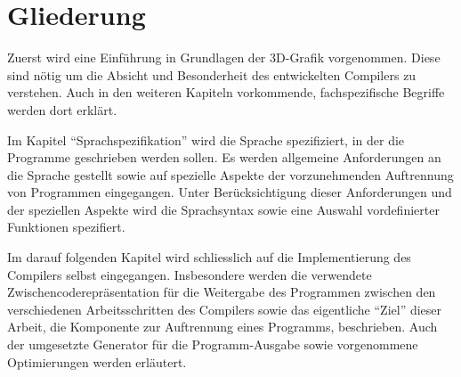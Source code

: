 \documentclass[twoside,a4paper,fleqn,12pt]{book}
\begin{document}



\section{Gliederung}

Zuerst wird eine Einführung in Grundlagen der 3D-Grafik vorgenommen. Diese sind nötig um die Absicht und Besonderheit des entwickelten Compilers zu verstehen.
Auch in den weiteren Kapiteln vorkommende, fachspezifische Begriffe werden dort erklärt.

Im Kapitel "`Sprachspezifikation"' wird die Sprache spezifiziert, in der die Programme geschrieben werden sollen.
Es werden allgemeine Anforderungen an die Sprache gestellt sowie auf spezielle Aspekte der vorzunehmenden Auftrennung von Programmen eingegangen.
Unter Berücksichtigung dieser Anforderungen und der speziellen Aspekte wird die Sprachsyntax sowie eine Auswahl vordefinierter Funktionen spezifiert.

Im darauf folgenden Kapitel wird schliesslich auf die Implementierung des Compilers selbst eingegangen. Insbesondere werden die verwendete Zwischencoderepräsentation
für die Weitergabe des Programmen zwischen den verschiedenen Arbeitsschritten des Compilers sowie das eigentliche "`Ziel"' dieser Arbeit,
die Komponente zur Auftrennung eines Programms, beschrieben. Auch der umgesetzte Generator für die Programm-Ausgabe sowie vorgenommene Optimierungen
werden erläutert.
\end{document}
